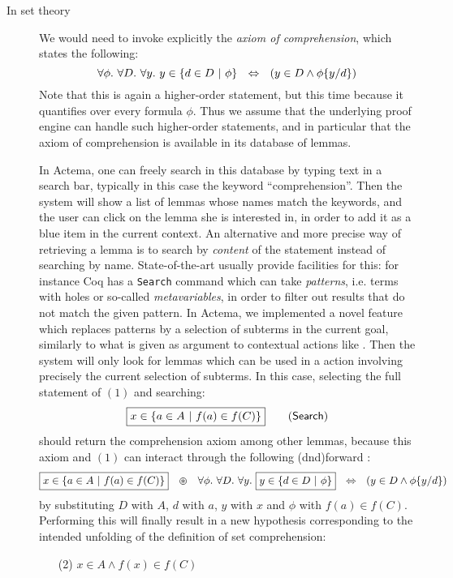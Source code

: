 \begin{description}
  \item[In  set theory]
    We would need to invoke explicitly the \emph{axiom of comprehension}, which
    states the following:
    $$\forall \phi.\ \forall D.\ \forall y.\ y \in \left\{d \in D ~\middle|~ \phi\right\} ~~\Leftrightarrow~~ (y \in D \land \phi \{ y / d \})$$
    Note that this is again a higher-order statement, but this time because it
    quantifies over every formula $\phi$. Thus we assume that the underlying
    proof engine can handle such higher-order statements, and in particular that
    the axiom of comprehension is available in its database of lemmas.
    
    In Actema, one can freely search in this database by typing text in a search
    bar, typically in this case the keyword ``comprehension''. Then the system
    will show a list of lemmas whose names match the keywords, and the user can
    click on the lemma she is interested in, in order to add it as a blue item
    in the current context. An alternative and more precise way of retrieving a
    lemma is to search by \emph{content} of the statement instead of searching
    by name. State-of-the-art  usually provide facilities for
    this: for instance Coq has a \texttt{Search} command which can take
    \emph{patterns}, i.e. terms with holes or so-called \emph{metavariables}, in
    order to filter out results that do not match the given pattern. In Actema,
    we implemented a novel feature which replaces patterns by a selection of
    subterms in the current goal, similarly to what is given as argument to
    contextual actions like . Then the system will only look for
    lemmas which can be used in a  action involving precisely the current
    selection of subterms. In this case, selecting the full statement of $(1)$
    and searching:
    $$\fbox{$x \in \left\{a \in A ~\middle|~ f(a) \in f(C)\right\}$} \qquad
    \text{(\textsf{Search})}$$
    should return the comprehension axiom among other lemmas, because this axiom
    and $(1)$ can interact through the following \kl(dnd){forward} :
    $$\fbox{$x \in \left\{a \in A ~\middle|~ f(a) \in f(C)\right\}$} ~~\operatorname{\,\varoast\,}~~ \forall \phi.\
    \forall D.\ \forall y.\ \fbox{$y \in \left\{d \in D ~\middle|~ \phi\right\}$} ~~\Leftrightarrow~~ (y
    \in D \land \phi \{ y / d \})$$ by substituting $D$ with $A$, $d$ with
    $a$, $y$ with $x$ and $\phi$ with $f(a) \in f(C)$. Performing this  will
    finally result in a new hypothesis corresponding to the intended unfolding
    of the definition of set comprehension\sidenote{Here in the sense of a
    \emph{behavioral} definition.}:
    \begin{itemize}
      \item[(2)] $x \in A \land f(x) \in f(C)$
    \end{itemize}
  

\end{description}
